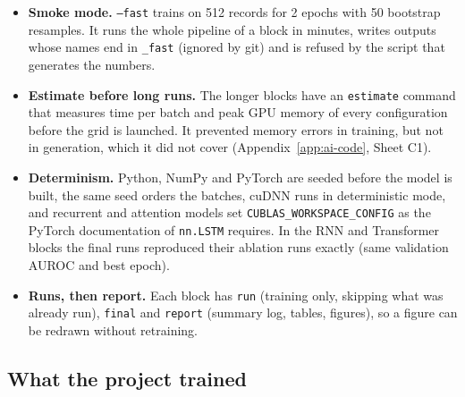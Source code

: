 \begin{itemize}[leftmargin=1.2em,itemsep=1pt]
  \item \textbf{Smoke mode.} \texttt{--fast} trains on 512 records for 2 epochs with 50 bootstrap
        resamples. It runs the whole pipeline of a block in minutes, writes outputs whose names end in
        \texttt{\_fast} (ignored by git) and is refused by the script that generates the numbers.
  \item \textbf{Estimate before long runs.} The longer blocks have an \texttt{estimate} command that
        measures time per batch and peak GPU memory of every configuration before the grid is launched.
        It prevented memory errors in training, but not in generation, which it did not cover
        (Appendix~\ref{app:ai-code}, Sheet C1).
  \item \textbf{Determinism.} Python, NumPy and PyTorch are seeded before the model is built, the same
        seed orders the batches, cuDNN runs in deterministic mode, and recurrent and attention models set
        \texttt{CUBLAS\_WORKSPACE\_CONFIG} as the PyTorch documentation of \texttt{nn.LSTM} requires.
        In the RNN and Transformer blocks the final runs reproduced their ablation runs exactly (same
        validation AUROC and best epoch).
  \item \textbf{Runs, then report.} Each block has \texttt{run} (training only, skipping what was already
        run), \texttt{final} and \texttt{report} (summary log, tables, figures), so a figure can be
        redrawn without retraining.
\end{itemize}

\subsection{What the project trained}

